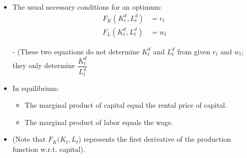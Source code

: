 \documentclass{beamer}
\begin{document}
\begin{frame}
    \begin{itemize}
        \item The usual necessary conditions for an optimum:
        \begin{align}
            F_{K}(K_{t}^{d},L_{t}^{d})&=r_{t}\\
            F_{L}(K_{t}^{d},L_{t}^{d})&=w_{t}
        \end{align}
        \item[-] (These two equations do not determine $K_{t}^{d}$ and $L_{t}^{d}$ from given $r_{t}$ and $w_{t}$; they only determine $\dfrac{K_{t}^{d}}{L_{t}^{d}}$
        \item In equilibrium:
        \begin{itemize} 
            \item The marginal product of capital equal the rental price of capital.
            \item The marginal product of labor equals the wage.
        \end{itemize}
        \item (Note that $F_{K}(K_{t},L_{t}$) represents the first derivative of the production function w.r.t. capital).
    \end{itemize}
\end{frame}
\end{document}
